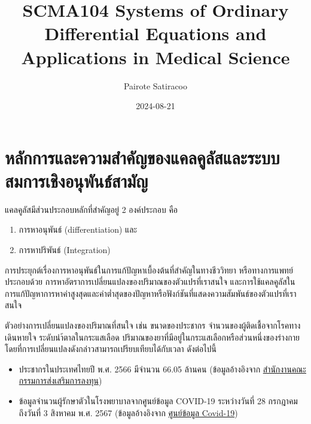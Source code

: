 \documentclass[
]{book}
\title{SCMA104 Systems of Ordinary Differential Equations and Applications in Medical Science}
\author{Pairote Satiracoo}
\date{2024-08-21}
\theoremstyle{definition}
\theoremstyle{definition}
\theoremstyle{definition}
\theoremstyle{definition}
\theoremstyle{remark}
\begin{document}
\maketitle

{
\setcounter{tocdepth}{1}
\tableofcontents
}

\cleardoublepage 
\setcounter{page}{1} 


\chapter{หลักการและความสำคัญของแคลคูลัสและระบบสมการเชิงอนุพันธ์สามัญ}\label{uxe2buxe25uxe01uxe01uxe32uxe23uxe41uxe25uxe30uxe04uxe27uxe32uxe21uxe2auxe33uxe04uxe0duxe02uxe2duxe07uxe41uxe04uxe25uxe04uxe25uxe2auxe41uxe25uxe30uxe23uxe30uxe1auxe1auxe2auxe21uxe01uxe32uxe23uxe40uxe0auxe07uxe2duxe19uxe1euxe19uxe18uxe2auxe32uxe21uxe0d}

แคลคูลัสมีส่วนประกอบหลักที่สำคัญอยู่ 2 องค์ประกอบ คือ

\begin{enumerate}
\def\labelenumi{\arabic{enumi}.}
\item
  การหาอนุพันธ์ (differentiation) และ
\item
  การหาปริพันธ์ (Integration)
\end{enumerate}

การประยุกต์เรื่องการหาอนุพันธ์ในการแก้ปัญหาเบื้องต้นที่สำคัญในทางชีววิทยา หรือทางการแพทย์ ประกอบด้วย การหาอัตราการเปลี่ยนแปลงของปริมาณของตัวแปรที่เราสนใจ และการใช้แคลคูลัสในการแก้ปัญหาการหาค่าสูงสุดและค่าต่ำสุดของปัญหาหรือฟังก์ชันที่แสดงความสัมพันธ์ของตัวแปรที่เราสนใจ

ตัวอย่างการเปลี่ยนแปลงของปริมาณที่สนใจ เช่น ขนาดของประชากร จำนวนของผู้ติดเชื้อจากโรคทางเดินหายใจ ระดับนำ้ตาลในกระแสเลือด ปริมาณของยาที่มีอยู่ในกระแสเลือกหรือส่วนหนึ่งของร่างกาย โดยที่การเปลี่ยนแปลงดังกล่าวสามารถเปรียบเทียบได้กับเวลา ดังต่อไปนี้

\begin{itemize}
\item
  ประชากรในประเทศไทยปี พ.ศ. 2566 มีจำนวน 66.05 ล้านคน (ข้อมูลอ้างอิงจาก \href{https://www.boi.go.th/index.php?page=demographic}{สำนักงานคณะกรรมการส่งเสริมการลงทุน})
\item
  ข้อมูลจำนวนผู้รักษาตัวในโรงพยาบาลจากศูนย์ข้อมูล COVID-19 ระหว่างวันที่ 28 กรกฎาคม ถึงวันที่ 3 สิงหาคม พ.ศ. 2567 (ข้อมูลอ้างอิงจาก \href{https://www.facebook.com/informationcovid19?locale=th_TH}{ศูนย์ข้อมูล Covid-19})
\end{itemize}
\end{document}
